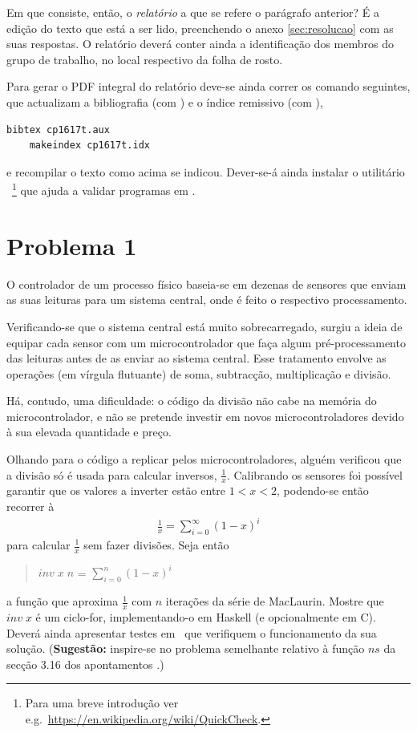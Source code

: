 \documentclass[a4paper]{article}
\newcommand{\Varid}[1]{\mathit{#1}}
\begin{document}
Em que consiste, então, o \emph{relatório} a que se refere o parágrafo anterior?
É a edição do texto que está a ser lido, preenchendo o anexo \ref{sec:resolucao}
com as suas respostas. O relatório deverá conter ainda a identificação dos membros
do grupo de trabalho, no local respectivo da folha de rosto.

Para gerar o PDF integral do relatório deve-se ainda correr os comando seguintes,
que actualizam a bibliografia (com \Bibtex) e o índice remissivo (com \Makeindex),
\begin{Verbatim}[fontsize=\small]
    bibtex cp1617t.aux
    makeindex cp1617t.idx
\end{Verbatim}
e recompilar o texto como acima se indicou. Dever-se-á ainda instalar o utilitário
\QuickCheck\ \footnote{Para uma breve introdução ver
e.g.\ \url{https://en.wikipedia.org/wiki/QuickCheck}.}
que ajuda a validar programas em \Haskell.

\section*{Problema 1}

O controlador de um processo físico baseia-se em dezenas de sensores que enviam
as suas leituras para um sistema central, onde é feito o respectivo processamento.

Verificando-se que o sistema central está muito sobrecarregado, surgiu a
ideia de equipar cada sensor com um microcontrolador que faça algum pré-processamento
das leituras antes de as enviar ao sistema central. Esse tratamento envolve
as operações (em vírgula flutuante) de soma, subtracção, multiplicação e divisão.

Há, contudo, uma dificuldade: o código da divisão não cabe na memória do
microcontrolador, e não se pretende investir em novos microcontroladores
devido à sua elevada quantidade e preço.

Olhando para o código a replicar pelos microcontroladores, alguém verificou que
a divisão só é usada para calcular inversos, \ensuremath{\frac{\mathrm{1}}{\Varid{x}}}. Calibrando os sensores foi
possível garantir que os valores a inverter estão entre $1 < x <2$,
podendo-se então recorrer à 
\begin{eqnarray*}
\ensuremath{\frac{\mathrm{1}}{\Varid{x}}} = \ensuremath{{\sum}}_{i=0}^\infty (1-x)^i
\end{eqnarray*}
para calcular \ensuremath{\frac{\mathrm{1}}{\Varid{x}}} sem fazer divisões.
Seja então
\begin{quote}
\ensuremath{\Varid{inv}\;\Varid{x}\;\Varid{n}} = $\ensuremath{{\sum}}_{i=0}^n(1-x)^i$
\end{quote}
a função que aproxima \ensuremath{\frac{\mathrm{1}}{\Varid{x}}} com \ensuremath{\Varid{n}} iterações da série de MacLaurin.
Mostre que \ensuremath{\Varid{inv}\;\Varid{x}} é um ciclo-for, implementando-o em Haskell (e opcionalmente em C).
Deverá ainda apresentar testes em \QuickCheck\ que verifiquem o funcionamento
da sua solução. (\textbf{Sugestão:} inspire-se no problema semelhante relativo
à função \ensuremath{\Varid{ns}} da secção 3.16 dos apontamentos \cite{Ol05}.)
\end{document}
